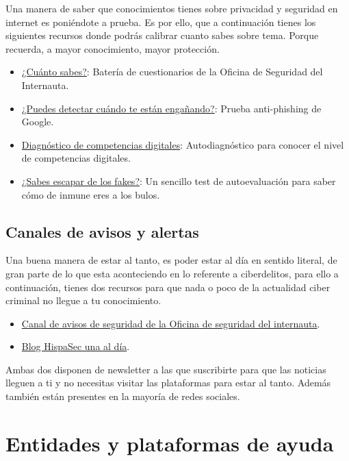 \documentclass[
  a4paper,
  openany]{book}
\begin{document}
Una manera de saber que conocimientos tienes sobre privacidad y seguridad en internet es poniéndote a prueba. Es por ello, que a continuación tienes los siguientes recursos donde podrás calibrar cuanto sabes sobre tema. Porque recuerda, a mayor conocimiento, mayor protección.

\begin{itemize}
\item
  \href{https://www.osi.es/es/cuanto-sabes}{¿Cuánto sabes?}: Batería de cuestionarios de la Oficina de Seguridad del Internauta.
\item
  \href{https://phishingquiz.withgoogle.com/?hl=es}{¿Puedes detectar cuándo te están engañando?}: Prueba anti-phishing de Google.
\item
  \href{https://www.digcomp.andaluciaesdigital.es/}{Diagnóstico de competencias digitales}: Autodiagnóstico para conocer el nivel de competencias digitales.
\item
  \href{https://www.proyectoescapefake.org/haz-el-test/}{¿Sabes escapar de los fakes?}: Un sencillo test de autoevaluación para saber cómo de inmune eres a los bulos.
\end{itemize}

\hypertarget{canales-de-avisos-y-alertas}{%
\section{Canales de avisos y alertas}\label{canales-de-avisos-y-alertas}}

Una buena manera de estar al tanto, es poder estar al día en sentido literal, de gran parte de lo que esta aconteciendo en lo referente a ciberdelitos, para ello a continuación, tienes dos recursos para que nada o poco de la actualidad ciber criminal no llegue a tu conocimiento.

\begin{itemize}
\item
  \href{https://www.osi.es/es/actualidad/avisos}{Canal de avisos de seguridad de la Oficina de seguridad del internauta}.
\item
  \href{https://unaaldia.hispasec.com/}{Blog HispaSec una al día}.
\end{itemize}

Ambas dos disponen de newsletter a las que suscribirte para que las noticias lleguen a ti y no necesitas visitar las plataformas para estar al tanto. Además también están presentes en la mayoría de redes sociales.

\hypertarget{entidades-y-plataformas-de-ayuda}{%
\chapter{Entidades y plataformas de ayuda}\label{entidades-y-plataformas-de-ayuda}}
\end{document}
